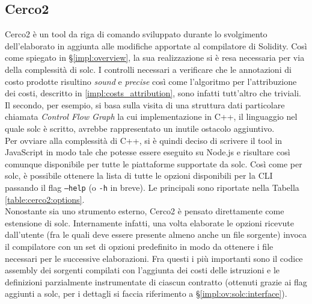 \documentclass[12pt,a4paper,openright,oneside]{report}
\theoremstyle{definition}
\begin{document}
\subsection{Cerco2}\label{impl:ov:cerco2}
Cerco2 \`{e} un tool da riga di comando sviluppato durante lo svolgimento dell'elaborato in aggiunta alle modifiche apportate al compilatore di Solidity. Cos\`{i} come spiegato in \S\ref{impl:overview}, la sua realizzazione si \`{e} resa necessaria per via della complessit\`{a} di solc. I controlli necessari a verificare che le annotazioni di costo prodotte risultino \textit{sound} e \textit{precise} cos\`{i} come l'algoritmo per l'attribuzione dei costi, descritto in \ref{impl:costs_attribution}, sono infatti tutt'altro che triviali. Il secondo, per esempio, si basa sulla visita di una struttura dati particolare chiamata \textit{Control Flow Graph} la cui implementazione in C++, il linguaggio nel quale solc \`{e} scritto, avrebbe rappresentato un inutile ostacolo aggiuntivo.\\
Per ovviare alla complessit\`{a} di C++, si \`{e} quindi deciso di scrivere il tool in JavaScript in modo tale che potesse essere eseguito su Node.js e risultare cos\`{i} comunque disponibile per tutte le piattaforme supportate da solc. Cos\`{i} come per solc, \`{e} possibile ottenere la lista di tutte le opzioni disponibili per la CLI passando il flag \texttt{--help} (o \texttt{-h} in breve). Le principali sono riportate nella Tabella \ref{table:cerco2:options}.\\
Nonostante sia uno strumento esterno, Cerco2 \`{e} pensato direttamente come estensione di solc. Internamente infatti, una volta elaborate le opzioni ricevute dall'utente (fra le quali deve essere presente almeno anche un file sorgente) invoca il compilatore con un set di opzioni predefinito in modo da ottenere i file necessari per le successive elaborazioni. Fra questi i pi\`{u} importanti sono il codice assembly dei sorgenti compilati con l'aggiunta dei costi delle istruzioni e le definizioni parzialmente instrumentate di ciascun contratto (ottenuti grazie ai flag aggiunti a solc, per i dettagli si faccia riferimento a \S\ref{impl:ov:solc:interface}).
\end{document}
